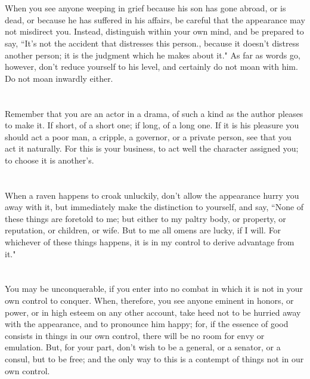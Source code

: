 \documentclass[12pt]{article}
\begin{document}
\section{}

When you see anyone weeping in grief because his son has gone
abroad, or is dead, or because he has suffered in his affairs, be
careful that the appearance may not misdirect you. Instead, distinguish
within your own mind, and be prepared to say, ``It's not the accident
that distresses this person., because it doesn't distress another
person; it is the judgment which he makes about it." As far as words
go, however, don't reduce yourself to his level, and certainly do
not moan with him. Do not moan inwardly either. 

\section{}

Remember that you are an actor in a drama, of such a kind as the
author pleases to make it. If short, of a short one; if long, of a
long one. If it is his pleasure you should act a poor man, a cripple,
a governor, or a private person, see that you act it naturally. For
this is your business, to act well the character assigned you; to
choose it is another's. 

\section{}

When a raven happens to croak unluckily, don't allow the appearance
hurry you away with it, but immediately make the distinction to yourself,
and say, ``None of these things are foretold to me; but either to my
paltry body, or property, or reputation, or children, or wife. But
to me all omens are lucky, if I will. For whichever of these things
happens, it is in my control to derive advantage from it."

\section{}

You may be unconquerable, if you enter into no combat in which
it is not in your own control to conquer. When, therefore, you see
anyone eminent in honors, or power, or in high esteem on any other
account, take heed not to be hurried away with the appearance, and
to pronounce him happy; for, if the essence of good consists in things
in our own control, there will be no room for envy or emulation. But,
for your part, don't wish to be a general, or a senator, or a consul,
but to be free; and the only way to this is a contempt of things not
in our own control. 
\end{document}
